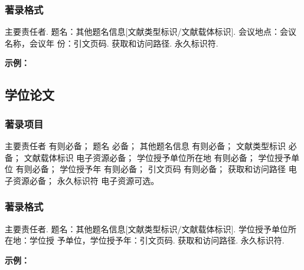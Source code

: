 \documentclass{article}
\begin{document}
\subsubsection{著录格式}
主要责任者. 题名：其他题名信息[文献类型标识/文献载体标识]. 会议地点：会议名称，会议年
份：引文页码. 获取和访问路径. 永久标识符.


\begin{refsection}
\nocite{王莉2023--,牛志明2012--,中国社会科学院台湾史研究中心2012--,肖希明2024民国}
\nocite{汪学军2002-22-25,贾东琴2011-45-52a,陈志勇2011--}
\nocite{WANG2022ACAIT,HU2024SSDBM,Yufin2000--}
\nocite{Babu2014--,FOURNEY1971-17-38}

{

\textbf{示例：}

{\printbibliography[heading=none,env=indentegenv]}
}
\end{refsection}


\subsection{学位论文}

\subsubsection{著录项目}

主要责任者 有则必备；
题名 必备；
其他题名信息 有则必备；
文献类型标识 必备；
文献载体标识 电子资源必备；
学位授予单位所在地 有则必备；
学位授予单位 有则必备；
学位授予年 有则必备；
引文页码 有则必备；
获取和访问路径 电子资源必备；
永久标识符 电子资源可选。

\subsubsection{著录格式}

主要责任者. 题名：其他题名信息[文献类型标识/文献载体标识]. 学位授予单位所在地：学位授
予单位，学位授予年：引文页码. 获取和访问路径. 永久标识符.

\begin{refsection}

\nocite{王琦2022,CALMS1965--,何筱梅2016,CHRISTOU2024,曲恩熙2023社交}


\textbf{示例：}

{\printbibliography[heading=none,env=indentegenv]}
\end{refsection}
\end{document}
